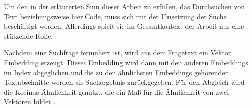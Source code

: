 \documentclass[../main.tex]{subfiles}
\begin{document}
Um den in der  erläuterten Sinn dieser Arbeit zu erfüllen, das Durchsuchen von Text beziehungsweise hier Code, muss sich mit der Umsetzung der Suche beschäftigt werden. Allerdings spielt sie im Gesamtkontext der Arbeit nur eine stützende Rolle.

Nachdem eine Suchfrage formuliert ist, wird aus dem Fragetext ein Vektor Embedding erzeugt.
Dieses Embedding wird dann mit den anderen Embeddings im Index abgeglichen und die zu den ähnlichsten Embeddings gehörenden Textabschnitte werden als Suchergebnis zurückgegeben. 
Für den Abgleich wird die Kosinus-Ähnlichkeit genutzt, die ein Maß für die Ähnlichkeit von zwei Vektoren bildet \cite{rahutomo2012semantic}.
\end{document}
